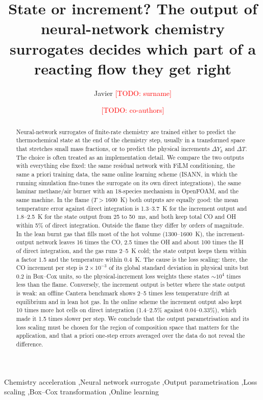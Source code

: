 \documentclass[preprint,review,12pt]{elsarticle}
\newcommand{\todo}[1]{\textcolor{red}{[TODO: #1]}}
\begin{document}
\begin{frontmatter}

\title{State or increment? The output of neural-network chemistry surrogates decides which part of
a reacting flow they get right}

\author[a]{Javier \todo{surname}}
\author[a]{\todo{co-authors}}
\address[a]{\todo{affiliation}}

\begin{abstract}
Neural-network surrogates of finite-rate chemistry are trained either to predict the thermochemical
state at the end of the chemistry step, usually in a transformed space that stretches small mass
fractions, or to predict the physical increments $\Delta Y_k$ and $\Delta T$. The choice is often
treated as an implementation detail. We compare the two outputs with everything else fixed: the same
residual network with FiLM conditioning, the same a priori training data, the same online learning
scheme (ISANN, in which the running simulation fine-tunes the surrogate on its own direct
integrations), the same laminar methane/air burner with an 18-species mechanism in OpenFOAM, and the
same machine. In the flame ($T>1600$~K) both outputs are equally good: the mean temperature error
against direct integration is 1.3--3.7~K for the increment output and 1.8--2.5~K for the state
output from 25 to 50~ms, and both keep total CO and OH within 5\% of direct integration. Outside the flame they differ by orders of magnitude.
In the lean burnt gas that fills most of the hot volume (1300--1600~K), the increment-output network
leaves 16 times the CO, 2.5 times the OH and about 100 times the H of direct integration, and the gas
runs 2--5~K cold; the state output keeps them within a factor 1.5 and the temperature within 0.4~K. The cause is the loss
scaling: there, the CO increment per step is $2\times10^{-3}$ of its global standard deviation in
physical units but 0.2 in Box--Cox units, so the physical-increment loss weights these states
$\sim10^4$ times less than the flame. Conversely, the increment output is better where the state
output is weak: an offline Cantera benchmark shows 2--5 times less temperature drift at equilibrium and
in lean hot gas. In the online scheme the increment output also kept 10 times more hot cells on direct integration
(1.4--2.5\% against 0.04--0.33\%), which made it 1.5 times slower per step. We conclude that the output parametrisation and its loss
scaling must be chosen for the region of composition space that matters for the application, and
that a priori one-step errors averaged over the data do not reveal the difference.
\end{abstract}

\begin{keyword}
Chemistry acceleration \sep Neural network surrogate \sep Output parametrisation \sep Loss scaling
\sep Box--Cox transformation \sep Online learning
\end{keyword}
\end{frontmatter}
\end{document}
